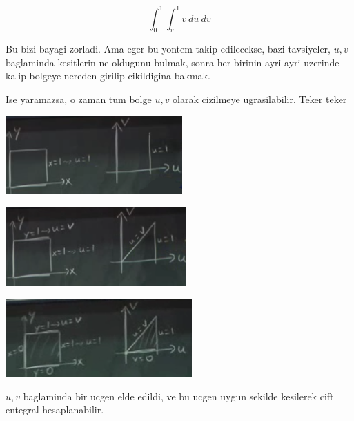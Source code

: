 \documentclass[12pt,fleqn]{article}\usepackage{../common}
\begin{document}
\[ \int_0^1 \int _v^1 v \ du \ dv \]

Bu bizi bayagi zorladi. Ama eger bu yontem takip edilecekse, bazi
tavsiyeler, $u,v$ baglaminda kesitlerin ne oldugunu bulmak, sonra her
birinin ayri ayri uzerinde kalip bolgeye nereden girilip cikildigina
bakmak. 

Ise yaramazsa, o zaman tum bolge $u,v$ olarak cizilmeye
ugrasilabilir. Teker teker 

\includegraphics[height=3cm]{18_9.png}

\includegraphics[height=3cm]{18_10.png}

\includegraphics[height=3cm]{18_11.png}

$u,v$ baglaminda bir ucgen elde edildi, ve bu ucgen uygun sekilde kesilerek
cift entegral hesaplanabilir. 
\end{document}

